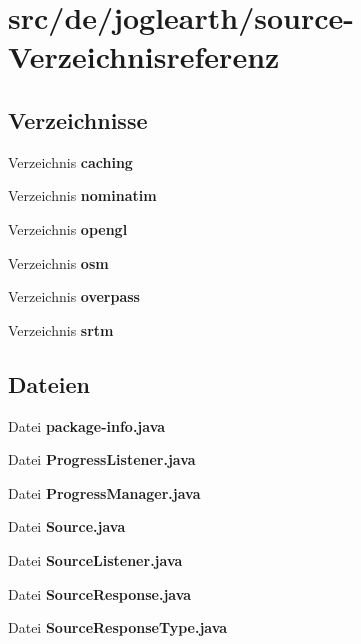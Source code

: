 \section{src/de/joglearth/source-\/\-Verzeichnisreferenz}
\label{dir_c63180d1461b2478dab0b9e41bf02ee8}
\subsection*{Verzeichnisse}
\begin{DoxyCompactItemize}
\item 
Verzeichnis {\bf caching}
\item 
Verzeichnis {\bf nominatim}
\item 
Verzeichnis {\bf opengl}
\item 
Verzeichnis {\bf osm}
\item 
Verzeichnis {\bf overpass}
\item 
Verzeichnis {\bf srtm}
\end{DoxyCompactItemize}
\subsection*{Dateien}
\begin{DoxyCompactItemize}
\item 
Datei {\bfseries package-\/info.\-java}
\item 
Datei {\bfseries Progress\-Listener.\-java}
\item 
Datei {\bfseries Progress\-Manager.\-java}
\item 
Datei {\bfseries Source.\-java}
\item 
Datei {\bfseries Source\-Listener.\-java}
\item 
Datei {\bfseries Source\-Response.\-java}
\item 
Datei {\bfseries Source\-Response\-Type.\-java}
\end{DoxyCompactItemize}
